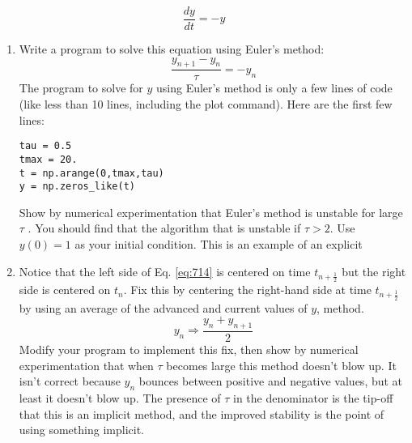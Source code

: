 \begin{equation}\label{eq:713}
\frac{dy}{dt	} = -y
\end{equation}
\begin{problem}\label{P7.2}
\begin{enumerate}[label=(\alph*)]
\item Write a program to solve this equation using Euler\rq s method:
\begin{equation}\label{eq:714}
\frac{y_{n+1}-y_n}{\tau} = -y_n
\end{equation}
The program to solve for $y$ using Euler\rq s method is only a few lines of
code (like less than 10 lines, including the plot command). Here are
the first few lines:
\begin{lstlisting}
tau = 0.5
tmax = 20.
t = np.arange(0,tmax,tau)
y = np.zeros_like(t)
\end{lstlisting}

Show by numerical experimentation that Euler\rq s method is unstable
for large $\tau$ . You should find that the algorithm that is unstable if $\tau > 2$.
Use $y(0) = 1$ as your initial condition. This is an example of an explicit
\item Notice that the left side of Eq. \ref{eq:714} is centered on time $t_{n+\frac{1}{2}}$ but the
right side is centered on $t_n$. Fix this by centering the right-hand side at time $t_{n+\frac{1}{2}}$ by using an average of the advanced and current values of $y$, method.
\begin{equation*}
y_{n} \Rightarrow \frac{y_{n}+y_{n+1}}{2}
\end{equation*}
Modify your program to implement this fix, then show by numerical
experimentation that when $\tau$ becomes large this method doesn\rq t blow
up. It isn\rq t correct because $y_n$ bounces between positive and negative
values, but at least it doesn\rq t blow up. The presence of $\tau$ in the denominator is the tip-off that this is an implicit method, and the improved
stability is the point of using something implicit.


\end{enumerate}
\end{problem}

